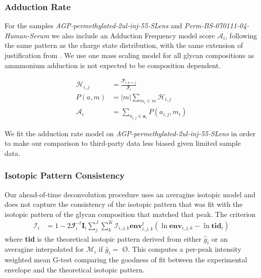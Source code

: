     \subsubsection{Adduction Rate}
        For the samples \textit{AGP-permethylated-2ul-inj-55-SLens} and \textit{Perm-BS-070111-04-Human-Serum}
        we also include an Adduction Frequency model score $\mathscr{A}_i$, following the same
        pattern as the charge state distribution, with the same extension of justification
        from \cite{Maxwell2012}. We use one mass scaling model for all glycan compositions
        as ammmonium adduction is not expected to be composition dependent.

        \begin{align}
            \mathcal{H}_{i,j} &= \frac{
                \mathbfcal{I}_{i, a=j}}{\mathbfcal{I}_i} \nonumber\\
            P(a, m) &= |m|\sum_{m_i \in m} \mathcal{H}_{i, j} \nonumber\\
            \mathscr{A}_i &= \sum_{a_{i, j} \in \mathbf{a}_i}{P(a_{i, j}, m_i)}
        \end{align}

        We fit the adduction rate model on \textit{AGP-permethylated-2ul-inj-55-SLens} in order
        to make our comparison to third-party data less biased given limited sample data.

    \subsubsection{Isotopic Pattern Consistency}
        Our ahead-of-time deconvolution procedure uses an averagine isotopic model and does not
        capture the consistency of the isotopic pattern that was fit with the isotopic pattern
        of the glycan composition that matched that peak. The criterion
        \begin{align}
            \mathscr{I}_i &= 1 - 2\mathbfcal{I}_i^{-t}\mathbf{I}_i\sum_j^J{
                \sum_k^K{\mathcal{I}_{i, j, k}
                    \textbf{env}_{i, j, k}^t\left(
                        \ln{\textbf{env}}_{i, j, k} -
                        \ln{\textbf{tid}_{i}}
                    \right)
                }
            }
        \end{align}
        \noindent where \textbf{tid} is the theoretical isotopic pattern derived from either ${\hat g}_i$
        or an averagine interpolated for $\mathcal{M}_i$ if ${\hat g}_i =$ \O. This computes a
        per-peak intensity weighted mean G-test comparing the goodness of fit between the experimental
        envelope and the theoretical isotopic pattern.

